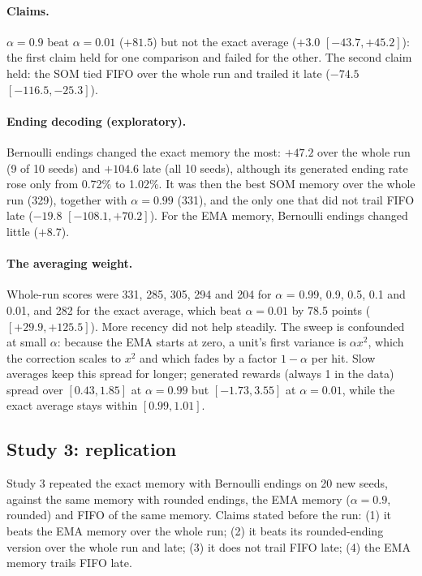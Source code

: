 \documentclass{article}
\begin{document}
\paragraph{Claims.} $\alpha = 0.9$ beat $\alpha = 0.01$ ($+81.5$) but not the
exact average ($+3.0$ $[-43.7, +45.2]$): the first claim held for one
comparison and failed for the other. The second claim held: the SOM tied
FIFO over the whole run and trailed it late ($-74.5$ $[-116.5, -25.3]$).

\paragraph{Ending decoding (exploratory).} Bernoulli endings changed the
exact memory the most: $+47.2$ over the whole run (9 of 10 seeds) and
$+104.6$ late (all 10 seeds), although its generated ending rate rose only
from 0.72\% to 1.02\%. It was then the best SOM memory over the whole run
(329), together with $\alpha = 0.99$ (331), and the only one that did not
trail FIFO late ($-19.8$ $[-108.1, +70.2]$). For the EMA memory, Bernoulli
endings changed little ($+8.7$).

\paragraph{The averaging weight.} Whole-run scores were 331, 285, 305, 294
and 204 for $\alpha$ = 0.99, 0.9, 0.5, 0.1 and 0.01, and 282 for the exact
average, which beat $\alpha = 0.01$ by 78.5 points ($[+29.9, +125.5]$). More
recency did not help steadily. The sweep is confounded at small $\alpha$:
because the EMA starts at zero, a unit's first variance is $\alpha x^2$,
which the correction scales to $x^2$ and which fades by a factor $1 - \alpha$
per hit. Slow averages keep this spread for longer; generated rewards (always
1 in the data) spread over $[0.43, 1.85]$ at $\alpha = 0.99$ but $[-1.73,
3.55]$ at $\alpha = 0.01$, while the exact average stays within $[0.99,
1.01]$.

\subsection{Study 3: replication}
\label{sec:res-repl}

Study 3 repeated the exact memory with Bernoulli endings on 20 new seeds,
against the same memory with rounded endings, the EMA memory ($\alpha =
0.9$, rounded) and FIFO of the same memory. Claims stated before the run:
(1) it beats the EMA memory over the whole run; (2) it beats its
rounded-ending version over the whole run and late; (3) it does not trail
FIFO late; (4) the EMA memory trails FIFO late.
\end{document}
